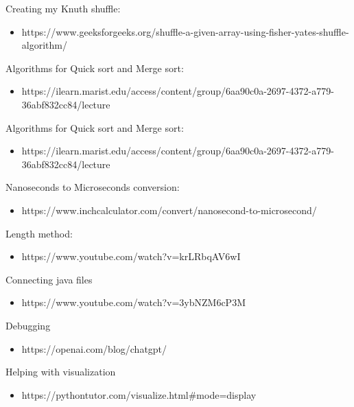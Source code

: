 \documentclass[a4paper,12pt]{article}
\begin{document}
Creating my Knuth shuffle:
    \begin{itemize}
    \item https://www.geeksforgeeks.org/shuffle-a-given-array-using-fisher-yates-shuffle-algorithm/
    \end{itemize}
Algorithms for Quick sort and Merge sort:
    \begin{itemize}
        \item https://ilearn.marist.edu/access/content/group/6aa90c0a-2697-4372-a779-36abf832cc84/lecture%
    \end{itemize}
Algorithms for Quick sort and Merge sort:
    \begin{itemize}
        \item https://ilearn.marist.edu/access/content/group/6aa90c0a-2697-4372-a779-36abf832cc84/lecture%
    \end{itemize}
Nanoseconds to Microseconds conversion:
    \begin{itemize}
    \item https://www.inchcalculator.com/convert/nanosecond-to-microsecond/
    \end{itemize}
Length method:
    \begin{itemize}
    \item https://www.youtube.com/watch?v=krLRbqAV6wI
    \end{itemize}
Connecting java files
    \begin{itemize}
        \item https://www.youtube.com/watch?v=3ybNZM6cP3M 
    \end{itemize}
Debugging
    \begin{itemize}
        \item https://openai.com/blog/chatgpt/ 
    \end{itemize}
Helping with visualization 
    \begin{itemize}
        \item https://pythontutor.com/visualize.html#mode=display
    \end{itemize}
\end{document}
